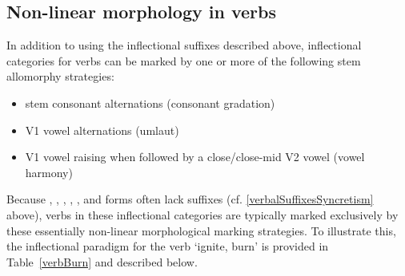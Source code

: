 \subsection{Non-linear morphology in verbs}\label{nonLinearMorphVerbs}
In addition to using the inflectional suffixes described above, inflectional categories for verbs can be marked %
by one or more of the following stem allomorphy strategies: %
\begin{itemize}
\item{stem consonant alternations (consonant gradation)}
\item{V1 vowel alternations (umlaut)}
\item{V1 vowel raising when followed by a close/close-mid V2 vowel (vowel harmony)}
\end{itemize}
Because , , , , ,  and  forms often lack suffixes (cf. \SEC\ref{verbalSuffixesSyncretism} above), verbs in these inflectional categories are typically marked exclusively by these essentially non-linear morphological marking strategies. 
To illustrate this, the inflectional paradigm for the verb  ‘ignite, burn’ is provided in Table~\vref{verbBurn} and described below. 
\renewcommand{\Xp}[1]{\MC{1}{x{90pt}}{#1}}%
